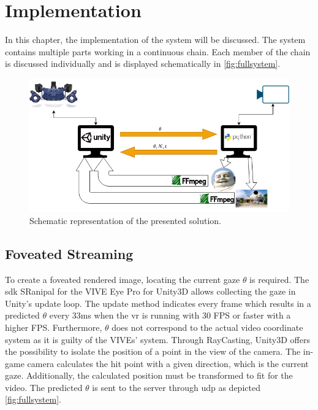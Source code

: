 
\chapter{Implementation}\label{chapter:implementation}
In this chapter, the implementation of the system will be discussed. The system contains multiple parts working in a continuous chain. Each member of the chain is discussed individually and is displayed schematically in \autoref{fig:fullsystem}.

\begin{figure}[htbp]
    \includegraphics[width=\textwidth,height=\textheight,keepaspectratio]{logos/SystemSchematic.png}
     \caption{Schematic representation of the presented solution.}
    \label{fig:fullsystem}
\end{figure}

\section{Foveated Streaming}\label{subsection:foveatedstreaming}
To create a foveated rendered image, locating the current gaze \(\theta\) is required. The \gls{sdk} SRanipal for the VIVE Eye Pro for Unity3D allows collecting the gaze in Unity’s update loop. The update method indicates every frame which results in a predicted \(\theta\) every 33ms when the \gls{vr} is running with 30 FPS or faster with a higher FPS. Furthermore, \(\theta\) does not correspond to the actual video coordinate system as it is guilty of the VIVEs’ system. Through RayCasting, Unity3D offers the possibility to isolate the position of a point in the view of the camera. The in-game camera calculates the hit point with a given direction, which is the current gaze. Additionally, the calculated position must be transformed to fit for the video. The predicted \(\theta\) is sent to the server through \gls{udp} as depicted \autoref{fig:fullsystem}.

